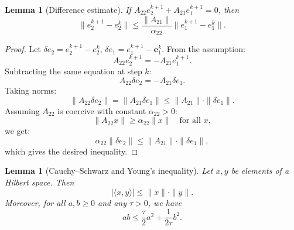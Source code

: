 \documentclass[pdflatex,sn-mathphys-num]{sn-jnl}
\theoremstyle{thmstyleone}%
\theoremstyle{thmstyletwo}%
\theoremstyle{thmstylethree}%
\newcommand{\Ree}{\operatorname{Re}}
\newtheorem{lemma}[theorem]{Lemma}
\theoremstyle{definition}
\begin{document}
	
	\begin{lemma}[Difference estimate]\label{lem: difference estimate}
		If $A_{22} e_2^{k+1} + A_{21} e_1^{k+1} = 0$, then
		\[
		\|e_2^{k+1} - e_2^{k}\| \le \frac{\|A_{21}\|}{\alpha_{22}} \|e_1^{k+1} - e_1^{k}\|.
		\]
	\end{lemma}
	
	\begin{proof}
		Let $\delta e_2 = e_2^{k+1} - e_2^k$, $\delta e_1 = e_1^{k+1} - \bm{e}_{1}^{k}$. From the assumption:
		\[
		A_{22} e_2^{k+1} = -A_{21} e_1^{k+1}.
		\]
		Subtracting the same equation at step $k$:
		\[
		A_{22} \delta e_2 = -A_{21} \delta e_1.
		\]
		Taking norms:
		\[
		\|A_{22} \delta e_2\| = \|A_{21} \delta e_1\| \le \|A_{21}\| \cdot \|\delta e_1\|.
		\]
		Assuming $A_{22}$ is coercive with constant $\alpha_{22} > 0$:
		\[
		\|A_{22} x\| \ge \alpha_{22} \|x\| \quad \text{for all } x,
		\]
		we get:
		\[
		\alpha_{22} \|\delta e_2\| \le \|A_{21}\| \cdot \|\delta e_1\|,
		\]
		which gives the desired inequality.
	\end{proof}
	
	
	\begin{lemma}[Cauchy--Schwarz and Young's inequality]
		Let $x, y$ be elements of a Hilbert space. Then
		\[
		|\langle x, y \rangle| \le \|x\| \cdot \|y\|.
		\]
		Moreover, for all $a, b \ge 0$ and any $\tau > 0$, we have
		\[
		ab \le \frac{\tau}{2} a^2 + \frac{1}{2\tau} b^2.
		\]
	\end{lemma}
	
	
\end{document}
